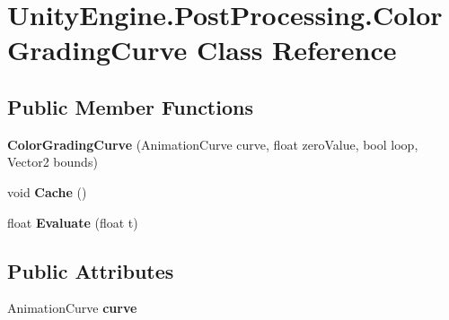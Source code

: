 \hypertarget{class_unity_engine_1_1_post_processing_1_1_color_grading_curve}{}\section{Unity\+Engine.\+Post\+Processing.\+Color\+Grading\+Curve Class Reference}
\label{class_unity_engine_1_1_post_processing_1_1_color_grading_curve}
\subsection*{Public Member Functions}
\begin{DoxyCompactItemize}
\item 
\mbox{\label{class_unity_engine_1_1_post_processing_1_1_color_grading_curve_ac68ca4da61fb2f9b5621f380319f43c3}} 
{\bfseries Color\+Grading\+Curve} (Animation\+Curve curve, float zero\+Value, bool loop, Vector2 bounds)
\item 
\mbox{\label{class_unity_engine_1_1_post_processing_1_1_color_grading_curve_a819bbd63f105f12ed7f341715088bf9b}} 
void {\bfseries Cache} ()
\item 
\mbox{\label{class_unity_engine_1_1_post_processing_1_1_color_grading_curve_af89e9253ac0366e5094cd59edc6933cb}} 
float {\bfseries Evaluate} (float t)
\end{DoxyCompactItemize}
\subsection*{Public Attributes}
\begin{DoxyCompactItemize}
\item 
\mbox{\label{class_unity_engine_1_1_post_processing_1_1_color_grading_curve_a9d614d239251bd42db12ad55b509f316}} 
Animation\+Curve {\bfseries curve}
\end{DoxyCompactItemize}
